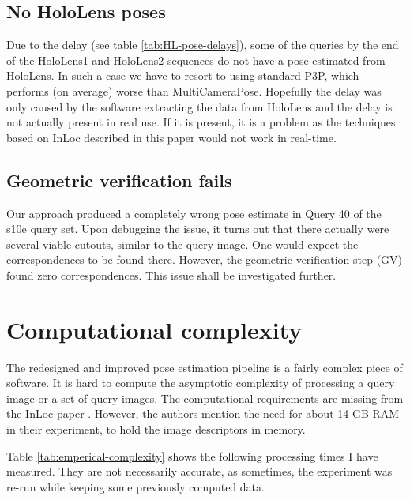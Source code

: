 \documentclass[twoside]{ctuthesis}
\theoremstyle{plain}
\theoremstyle{definition}
\theoremstyle{note}
\begin{document}
\subsection{No HoloLens poses}
Due to the delay (see table \ref{tab:HL-pose-delays}), some of the queries by the end of the HoloLens1 and HoloLens2 sequences do not have a pose estimated from HoloLens. In such a case we have to resort to using standard P3P, which performs (on average) worse than MultiCameraPose. Hopefully the delay was only caused by the software extracting the data from HoloLens and the delay is not actually present in real use. If it is present, it is a problem as the techniques based on InLoc described in this paper would not work in real-time.

\subsection{Geometric verification fails}
\label{subsection:GV-fails}
Our approach produced a completely wrong pose estimate in Query 40 of the s10e query set. Upon debugging the issue, it turns out that there actually were several viable cutouts, similar to the query image. One would expect the correspondences to be found there. However, the geometric verification step (GV) found zero correspondences. This issue shall be investigated further.

\section{Computational complexity}
The redesigned and improved pose estimation pipeline is a fairly complex piece of software. It is hard to compute the asymptotic complexity of processing a query image or a set of query images. The computational requirements are missing from the InLoc paper \cite{taira2018inloc}. However, the authors mention the need for about 14 GB RAM in their experiment, to hold the image descriptors in memory.

Table \ref{tab:emperical-complexity} shows the following processing times I have measured. They are not necessarily accurate, as sometimes, the experiment was re-run while keeping some previously computed data.
\end{document}
